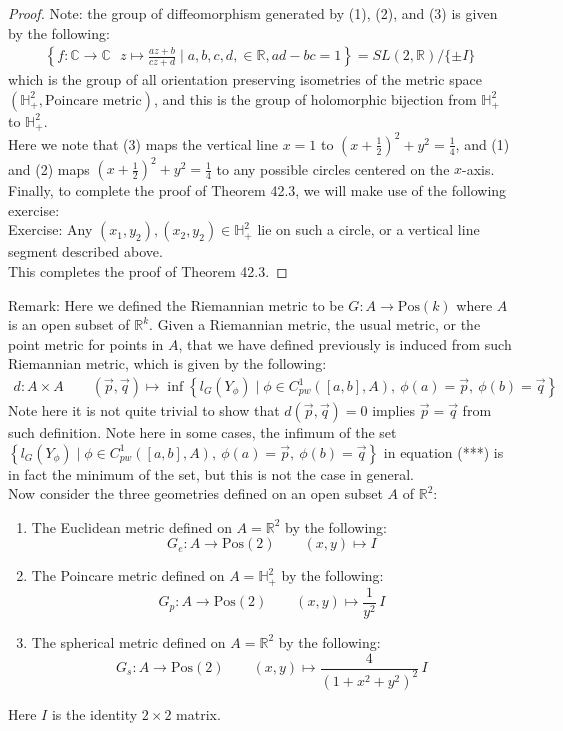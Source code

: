 \documentclass[11pt,oneside]{book}
\theoremstyle{break}
\theoremstyle{break}
\newcommand{\R}{\mathbb{R}}
\newcommand{\Complex}{\mathbb{C}}
\newcommand{\note}{\color{red}Note: \color{black}}
\newcommand{\remark}{\color{blue}Remark: \color{black}}
\newcommand{\exercise}{\color{green}Exercise: \color{black}}
\begin{document}
\begin{proof}
\note the group of diffeomorphism generated by (1), (2), and (3) is given by the following:
\begin{align*}
\left\{f:\Complex \to \Complex \ \ \ z\mapsto \frac{az+b}{cz+d} \mid a,b,c,d,\in \R , ad-bc = 1\right\} = SL(2,\R) / \{\pm I\}
\end{align*}
which is the group of all orientation preserving isometries of the metric space $(\mathbb{H}_+^2, \text{Poincare metric})$, and this is the group of holomorphic bijection from $\mathbb{H}_+^2$ to $\mathbb{H}_+^2$.\\

Here we note that (3) maps the vertical line $x=1$ to $(x+\frac{1}{2})^2 + y^2 = \frac{1}{4}$, and (1) and (2) maps $(x+\frac{1}{2})^2 + y^2 = \frac{1}{4}$ to any possible circles centered on the $x$-axis.\\

Finally, to complete the proof of Theorem 42.3, we will make use of the following exercise:\\

\exercise Any $(x_1,y_2),(x_2,y_2) \in \mathbb{H}_+^2$ lie on such a circle, or a vertical line segment described above. \\

This completes the proof of Theorem 42.3.
\end{proof}

\remark Here we defined the Riemannian metric to be $G:A \to \text{Pos}(k)$ where $A$ is an open subset of $\R^k$. Given a Riemannian metric, the usual metric, or the point metric for points in $A$, that we have defined previously is induced from such Riemannian metric, which is given by the following:
\begin{align*}
d:A \times A \qquad (\vec{p},\vec{q}) \mapsto \inf \left\{l_G(Y_{\phi}) \mid \phi \in C_{pw}^1([a,b],A),\ \phi(a) = \vec{p}, \ \phi(b) = \vec{q}\right\} \tag{***}
\end{align*}
Note here it is not quite trivial to show that $d(\vec{p},\vec{q}) = 0$ implies $\vec{p} = \vec{q}$ from such definition. Note here in some cases, the infimum of the set $\left\{l_G(Y_{\phi}) \mid \phi \in C_{pw}^1([a,b],A),\ \phi(a) = \vec{p}, \ \phi(b) = \vec{q}\right\} $ in equation (***) is in fact the minimum of the set, but this is not the case in general. \\


Now consider the three geometries defined on an open subset $A$ of $\R^2$:
\begin{enumerate}[topsep=3pt,itemsep=-1ex,partopsep=1ex,parsep=1ex]
\item The Euclidean metric defined on $A = \R^2$ by the following: 
	  $$G_e:A \to \text{Pos}(2) \qquad (x,y) \mapsto I$$ 
\item The Poincare metric defined on $A = \mathbb{H}_+^2$ by the following: 
	  $$G_p:A \to \text{Pos}(2) \qquad (x,y) \mapsto \frac{1}{y^2}\, I $$
\item The spherical metric defined on $A = \R^2$ by the following: 
	  $$G_s:A \to \text{Pos}(2) \qquad (x,y) \mapsto \frac{4}{(1+x^2 + y^2)^2}\, I$$ 
\end{enumerate}
Here $I$ is the identity $2\times 2$ matrix.\\
\end{document}
